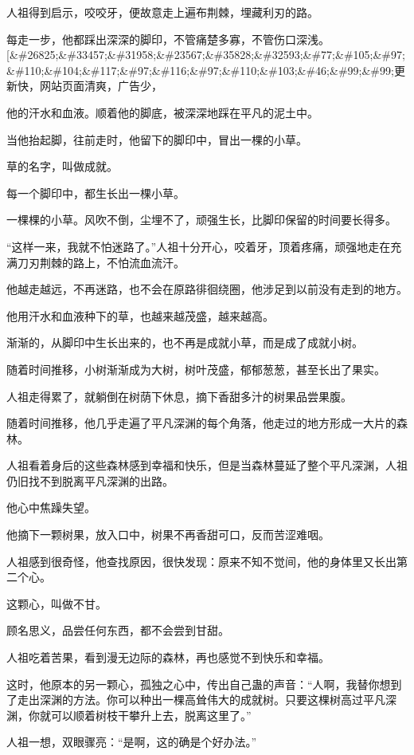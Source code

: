 \begin{this_body}
人祖得到启示，咬咬牙，便故意走上遍布荆棘，埋藏利刃的路。

每走一步，他都踩出深深的脚印，不管痛楚多寡，不管伤口深浅。[\&\#26825;\&\#33457;\&\#31958;\&\#23567;\&\#35828;\&\#32593;\&\#77;\&\#105;\&\#97;\&\#110;\&\#104;\&\#117;\&\#97;\&\#116;\&\#97;\&\#110;\&\#103;\&\#46;\&\#99;\&\#99;更新快，网站页面清爽，广告少，

他的汗水和血液。顺着他的脚底，被深深地踩在平凡的泥土中。

当他抬起脚，往前走时，他留下的脚印中，冒出一棵的小草。

草的名字，叫做成就。

每一个脚印中，都生长出一棵小草。

一棵棵的小草。风吹不倒，尘埋不了，顽强生长，比脚印保留的时间要长得多。

“这样一来，我就不怕迷路了。”人祖十分开心，咬着牙，顶着疼痛，顽强地走在充满刀刃荆棘的路上，不怕流血流汗。

他越走越远，不再迷路，也不会在原路徘徊绕圈，他涉足到以前没有走到的地方。

他用汗水和血液种下的草，也越来越茂盛，越来越高。

渐渐的，从脚印中生长出来的，也不再是成就小草，而是成了成就小树。

随着时间推移，小树渐渐成为大树，树叶茂盛，郁郁葱葱，甚至长出了果实。

人祖走得累了，就躺倒在树荫下休息，摘下香甜多汁的树果品尝果腹。

随着时间推移，他几乎走遍了平凡深渊的每个角落，他走过的地方形成一大片的森林。

人祖看着身后的这些森林感到幸福和快乐，但是当森林蔓延了整个平凡深渊，人祖仍旧找不到脱离平凡深渊的出路。

他心中焦躁失望。

他摘下一颗树果，放入口中，树果不再香甜可口，反而苦涩难咽。

人祖感到很奇怪，他查找原因，很快发现：原来不知不觉间，他的身体里又长出第二个心。

这颗心，叫做不甘。

顾名思义，品尝任何东西，都不会尝到甘甜。

人祖吃着苦果，看到漫无边际的森林，再也感觉不到快乐和幸福。

这时，他原本的另一颗心，孤独之心中，传出自己蛊的声音：“人啊，我替你想到了走出深渊的方法。你可以种出一棵高耸伟大的成就树。只要这棵树高过平凡深渊，你就可以顺着树枝干攀升上去，脱离这里了。”

人祖一想，双眼骤亮：“是啊，这的确是个好办法。”


\end{this_body}
